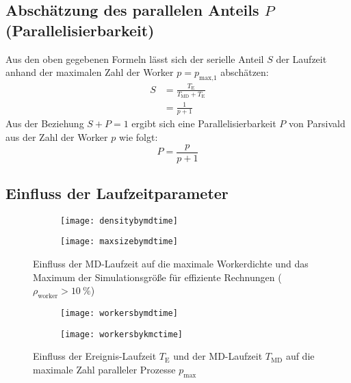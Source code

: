 \subsection{Abschätzung des parallelen Anteils $P$ (Parallelisierbarkeit)}

Aus den oben gegebenen Formeln lässt sich der serielle Anteil $S$ der Laufzeit anhand der maximalen Zahl der Worker $p = p_\text{max,1}$ abschätzen:
\begin{align}
  S & = \frac{T_\text{E}}{T_\text{MD} + T_\text{E}} \\
    & = \frac{1}{p + 1}
\end{align}
Aus der Beziehung $S + P = 1$ ergibt sich eine Parallelisierbarkeit $P$ von Parsivald aus der Zahl der Worker $p$ wie folgt:
\begin{equation}
  P = \frac{p}{p+1}
\end{equation}


\subsection{Einfluss der Laufzeitparameter}

\begin{figure}
  
  \captionsetup[subfigure]{singlelinecheck=false}
  \def\subfigwidth{7cm}
  \begin{subfigure}[t]{\subfigwidth}
    \texttt{[image: densitybymdtime]}
  \end{subfigure}
  \hfill
  \begin{subfigure}[t]{\subfigwidth}
    \texttt{[image: maxsizebymdtime]}
  \end{subfigure}

  \caption{Einfluss der MD-Laufzeit auf die maximale Workerdichte und das Maximum der Simulationsgröße für effiziente Rechnungen ($\rho_\text{worker} > \SI{10}{\percent}$)}
  
\end{figure}

\begin{figure}
  
  \captionsetup[subfigure]{singlelinecheck=false}
  \def\subfigwidth{7cm}
  \begin{subfigure}[t]{\subfigwidth}
    \texttt{[image: workersbymdtime]}
  \end{subfigure}
  \hfill
  \begin{subfigure}[t]{\subfigwidth}
    \texttt{[image: workersbykmctime]}
  \end{subfigure}

  \caption{Einfluss der Ereignis-Laufzeit $T_\text{E}$ und der MD-Laufzeit $T_\text{MD}$ auf die maximale Zahl paralleler Prozesse $p_\text{max}$}
  
\end{figure}

